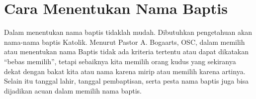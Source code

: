 	
	
		
		
\section{Cara Menentukan Nama Baptis}
\label{sec:caramenentukannamabaptis}

Dalam menentukan nama baptis tidaklah mudah. Dibutuhkan pengetahuan akan nama-nama baptis Katolik. Menurut Pastor A. Bogaarts, OSC, dalam memilih atau menentukan nama Baptis tidak ada kriteria tertentu atau dapat dikatakan ``bebas memilih'', tetapi sebaiknya kita memilih orang kudus yang sekiranya dekat dengan bakat kita atau nama karena mirip atau memilih karena artinya. Selain itu tanggal lahir, tanggal pembaptisan, serta pesta nama baptis juga bisa dijadikan acuan dalam memilih nama baptis. 


